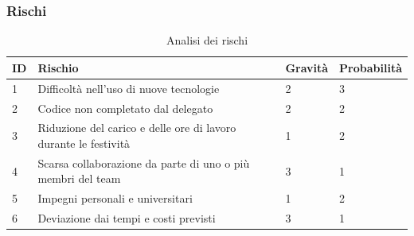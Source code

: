 \documentclass{article}
\begin{document}
        \subsubsection{Rischi}
        \begin{table}[h]
            \centering
            \begin{tabular}{|p{0.5cm}|p{7cm}|p{2cm}|p{2cm}|}
                \hline
                \textbf{ID} & \textbf{Rischio} & \textbf{Gravità} & \textbf{Probabilità} \\
                \hline
                1 & Difficoltà nell'uso di nuove tecnologie & 2 & 3 \\ 
                \hline
                2 & Codice non completato dal delegato & 2 & 2 \\ 
                \hline
                3 & Riduzione del carico e delle ore di lavoro durante le festività & 1 & 2 \\ 
                \hline 
                4 & Scarsa collaborazione da parte di uno o più membri del team & 3 & 1 \\ 
                \hline
                5 & Impegni personali e universitari & 1 & 2 \\ 
                \hline 
                6 & Deviazione dai tempi e costi previsti & 3 & 1 \\
                \hline
            \end{tabular}
            \caption{Analisi dei rischi}
            \label{tab:analisi_rischi}
        \end{table}
\end{document}
